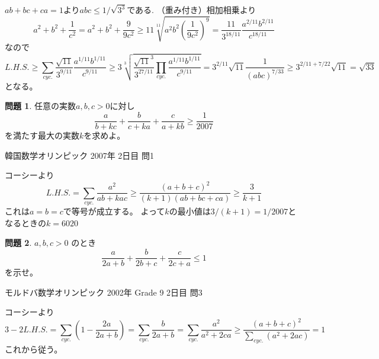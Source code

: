 \documentclass[uplatex, a5paper]{jsarticle}
\makeatletter
\theoremstyle{definition}
\newtheorem{prob}{問題}
\renewenvironment{proof}[1][\proofname]{
  \pushQED{\qed}%
  \normalfont \topsep6\p@\@plus6\p@\relax
  \trivlist
  \item[\hskip\labelsep
    #1\@addpunct{\textbf{.}}]\ignorespaces
}{%
  \popQED\endtrivlist\@endpefalse
}
\providecommand{\proofname}{証明}
\newcommand{\lhs }{ L.H.S. }
\def\qed{\hfill $\Box$}
\makeatother
\begin{document}
\begin{proof}
  \(ab+bc+ca=1\)より\(abc \leq 1/\sqrt{3^3}\)である.
  （重み付き）相加相乗より
  \[
  a^2 + b^2 + \frac{1}{c^2}
  = a^2+b^2 + \frac{9}{9c^2}
  \geq 11\sqrt[11]{a^2b^2\left( \frac{1}{9c^2} \right) ^9 }
  = \frac{11}{3^{18/11}} \frac{a^{2/11}b^{2/11}}{c^{18/11}}
  \]
  なので
  \[
  \lhs \geq \sum_{cyc.} \frac{\sqrt{11}}{3^{9/11}} \frac{a^{1/11}b^{1/11}}{c^{9/11}}
  \geq 3 \sqrt[3]{ \frac{\sqrt{11} ^3}{3^{27/11}} \prod_{cyc.}\frac{a^{1/11}b^{1/11}}{c^{9/11}} }
  = 3^{2/11}\sqrt{11} \frac{1}{(abc)^{7/33}}
  \geq 3^{2/11 +  7/22}\sqrt{11} = \sqrt{33}
  \]
  となる。
\end{proof}











\newpage


\begin{prob}
  任意の実数\(a,b,c > 0\)に対し
  \[
  \frac{a}{b+kc} + \frac{b}{c+ka} + \frac{c}{a+kb} \geq \frac{1}{2007}
  \]
  を満たす最大の実数\(k\)を求めよ。
  \begin{flushright}
    韓国数学オリンピック 2007年 2日目 問1
  \end{flushright}
\end{prob}


\begin{proof}
  コーシーより
  \[
  \lhs = \sum_{cyc.} \frac{a^2}{ab+kac} \geq \frac{(a+b+c)^2}{(k+1)(ab+bc+ca)} \geq \frac{3}{k+1}
  \]
  これは\(a=b=c\)で等号が成立する。
  よって\(k\)の最小値は\(3/(k+1)=1/2007\)となるときの\(k=6020\)
\end{proof}










\newpage

\begin{prob}
  \(a,b,c>0\)
  のとき
  \[
  \frac{a}{2a+b} + \frac{b}{2b+c} + \frac{c}{2c+a} \leq 1
  \]
  を示せ。
  \begin{flushright}
    モルドバ数学オリンピック 2002年 Grade 9 2日目 問3
  \end{flushright}
\end{prob}


\begin{proof}
  コーシーより
  \[
  3- 2\lhs
  = \sum_{cyc.} \left( 1 - \frac{2a}{2a+b} \right)
  = \sum_{cyc.} \frac{b}{2a+b}
  = \sum_{cyc.} \frac{a^2}{a^2+2ca}
  \geq \frac{(a+b+c)^2}{\sum_{cyc.} (a^2+2ac) } = 1
  \]
  これから従う。
\end{proof}
\end{document}
